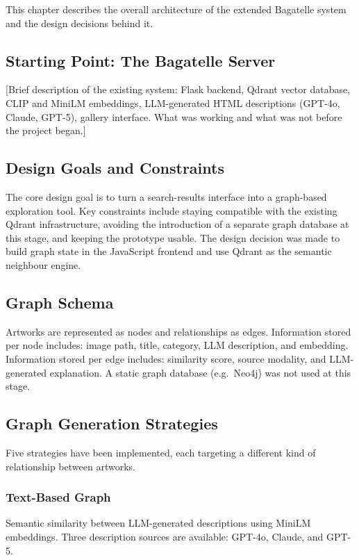 \documentclass[12pt, a4paper]{article}
\begin{document}
This chapter describes the overall architecture of the extended Bagatelle system and the design
decisions behind it.

\subsection{Starting Point: The Bagatelle Server}

[Brief description of the existing system: Flask backend, Qdrant vector database, CLIP and MiniLM
embeddings, LLM-generated HTML descriptions (GPT-4o, Claude, GPT-5), gallery interface. What
was working and what was not before the project began.]

\subsection{Design Goals and Constraints}

The core design goal is to turn a search-results interface into a graph-based exploration tool. Key
constraints include staying compatible with the existing Qdrant infrastructure, avoiding the
introduction of a separate graph database at this stage, and keeping the prototype usable. The
design decision was made to build graph state in the JavaScript frontend and use Qdrant as the
semantic neighbour engine.

\subsection{Graph Schema}

Artworks are represented as nodes and relationships as edges. Information stored per node
includes: image path, title, category, LLM description, and embedding. Information stored per
edge includes: similarity score, source modality, and LLM-generated explanation. A static graph
database (e.g.\ Neo4j) was not used at this stage.

\subsection{Graph Generation Strategies}

Five strategies have been implemented, each targeting a different kind of relationship between
artworks.

\subsubsection{Text-Based Graph}
Semantic similarity between LLM-generated descriptions using MiniLM embeddings. Three
description sources are available: GPT-4o, Claude, and GPT-5.
\end{document}
